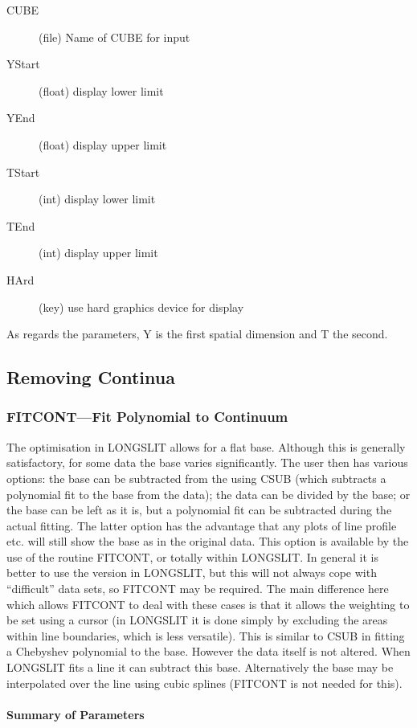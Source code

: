 \begin{description}
\item[CUBE] (file) Name of CUBE for input
\item[YStart] (float) display lower limit
\item[YEnd] (float) display upper limit
\item[TStart] (int) display lower limit
\item[TEnd] (int) display upper limit
\item[HArd] (key) use hard graphics device for display
\end{description}
As regards the parameters, Y is the first spatial dimension and T the
second.

\subsection{\label{removing_continua}Removing Continua}
\subsubsection{FITCONT---Fit Polynomial to Continuum}

The optimisation in LONGSLIT allows for a flat base.
Although this is generally satisfactory, for some data the base varies
significantly.
The user then has various options: the base can be subtracted from the
using CSUB (which subtracts a polynomial fit to the base from the
data); the data can be divided by the base; or the base can be left as
it is, but a polynomial fit can be subtracted during the actual fitting.
The latter option has the advantage that any plots of line profile etc.
will still show the base as in the original data.
This option is available by the use of the routine FITCONT, or totally
within LONGSLIT.
In general it is better to use the version in LONGSLIT, but this will
not always cope with ``difficult'' data sets, so FITCONT may be
required.
The main difference here which allows FITCONT to deal with these cases
is that it allows the weighting to be set using a cursor (in LONGSLIT it
is done simply by excluding the areas within line boundaries, which is
less versatile).
This is similar to CSUB in fitting a Chebyshev polynomial to the base.
However the data itself is not altered.
When LONGSLIT fits a line it can subtract this base.
Alternatively the base may be interpolated over the line using cubic
splines (FITCONT is not needed for this).

\paragraph{Summary of Parameters}


